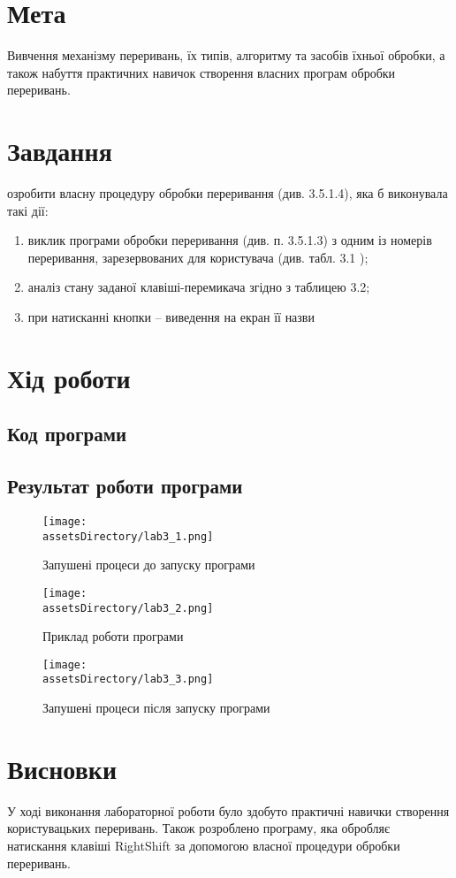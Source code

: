 \section{Мета}
Вивчення механізму переривань, їх типів, алгоритму та
засобів їхньої обробки, а також набуття практичних навичок створення
власних програм обробки переривань.

\section{Завдання}
озробити власну процедуру обробки переривання (див. 3.5.1.4),
яка б виконувала такі дії:
\begin{enumerate}
    \item виклик програми обробки переривання (див. п. 3.5.1.3) з одним із номерів переривання, зарезервованих для користувача (див. табл. 3.1 );
    \item аналіз стану заданої клавіші-перемикача згідно з таблицею 3.2;
    \item при натисканні кнопки – виведення на екран її назви
\end{enumerate}

\section{Хід роботи}
\subsection{Код програми}


\subsection{Результат роботи програми}
\begin{figure}[ht!]
    \centering
    \texttt{[image: \\assetsDirectory/lab3\_1.png]}
    \caption{Запушені процеси до запуску програми}
\end{figure}
\begin{figure}[ht!]
    \centering
    \texttt{[image: \\assetsDirectory/lab3\_2.png]}
    \caption{Приклад роботи програми}
\end{figure}
\begin{figure}[ht!]
    \centering
    \texttt{[image: \\assetsDirectory/lab3\_3.png]}
    \caption{Запушені процеси після запуску програми}
\end{figure}

\clearpage
\section{Висновки}
У ході виконання лабораторної роботи було здобуто практичні навички створення користувацьких переривань.
Також розроблено програму, яка обробляє натискання клавіші RightShift за допомогою власної процедури обробки переривань.
